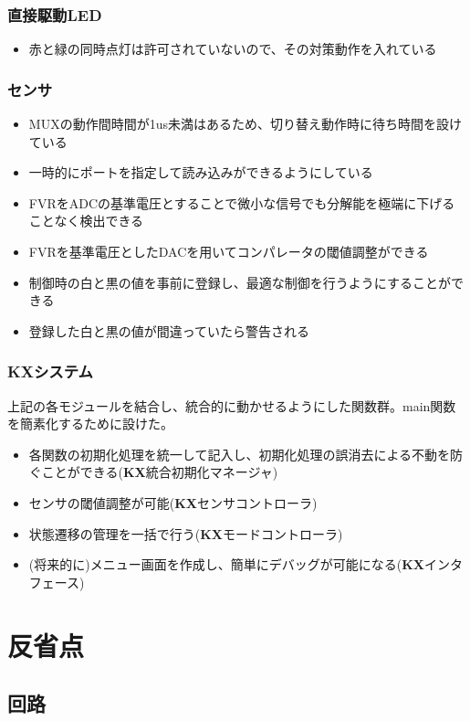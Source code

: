 \documentclass[a4paper]{ltjsarticle}
\newcommand{\kasix}{\textbf{K\hspace{-0.31em}\raisebox{0.17em}{\scalebox{0.7}{A}}\hspace{-0.11em}{S}\hspace{-0.08em}\scalebox{0.8}{i}\hspace{-0.1em}X}}
\begin{document}
\subsubsection{直接駆動LED}
\begin{itemize}
  \item 赤と緑の同時点灯は許可されていない\cite{ds:led}ので、その対策動作を入れている
\end{itemize}
\subsubsection{センサ}
\begin{itemize}
  \item MUXの動作間時間が1us未満はある\cite{ds:mux}ため、切り替え動作時に待ち時間を設けている
  \item 一時的にポートを指定して読み込みができるようにしている
  \item FVRをADCの基準電圧とすることで微小な信号でも分解能を極端に下げることなく検出できる
  \item FVRを基準電圧としたDACを用いてコンパレータの閾値調整ができる
  \item 制御時の白と黒の値を事前に登録し、最適な制御を行うようにすることができる
  \item 登録した白と黒の値が間違っていたら警告される
\end{itemize}
\subsubsection{\kasix システム}
上記の各モジュールを結合し、統合的に動かせるようにした関数群。main関数を簡素化するために設けた。
\begin{itemize}
  \item 各関数の初期化処理を統一して記入し、初期化処理の誤消去による不動を防ぐことができる(\kasix 統合初期化マネージャ)
  \item センサの閾値調整が可能(\kasix センサコントローラ)
  \item 状態遷移の管理を一括で行う(\kasix モードコントローラ)
  \item (将来的に)メニュー画面を作成し、簡単にデバッグが可能になる(\kasix インタフェース)
\end{itemize}



\section{反省点}
\subsection{回路}
\end{document}
